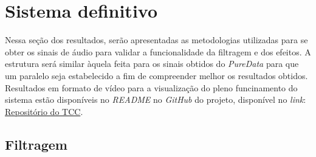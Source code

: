 

\section{Sistema definitivo}

Nessa seção dos resultados, serão apresentadas as metodologias utilizadas para se obter os sinais de áudio para validar a funcionalidade da filtragem e dos efeitos. A estrutura será similar àquela feita para os sinais obtidos do \textit{PureData} para que um paralelo seja estabelecido a fim de compreender melhor os resultados obtidos. Resultados em formato de vídeo para a visualização do pleno funcinamento do sistema estão disponíveis no \textit{README} no \textit{GitHub} do projeto, disponível no \textit{link}: \href{https://github.com/joselitopradomarques/tcc}{Repositório do TCC}.


\subsection{Filtragem}



